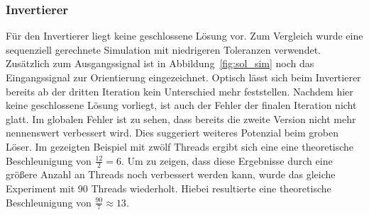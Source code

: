 \subsubsection*{Invertierer}
Für den Invertierer liegt keine geschlossene Lösung vor. Zum Vergleich wurde eine sequenziell gerechnete Simulation mit niedrigeren Toleranzen verwendet. Zusätzlich zum Ausgangssignal ist in Abbildung~\ref{fig:sol_sim} noch das Eingangssignal zur Orientierung eingezeichnet. Optisch lässt sich beim Invertierer bereits ab der dritten Iteration kein Unterschied mehr feststellen. Nachdem hier keine geschlossene Lösung vorliegt, ist auch der Fehler der finalen Iteration nicht glatt. Im globalen Fehler ist zu sehen, dass bereits die zweite Version nicht mehr nennenswert verbessert wird. Dies suggeriert weiteres Potenzial beim groben Löser. Im gezeigten Beispiel mit zwölf Threads ergibt sich eine eine theoretische Beschleunigung von \(\frac{12}{2} = 6\). Um zu zeigen, dass diese Ergebnisse durch eine größere Anzahl an Threads noch verbessert werden kann, wurde das gleiche Experiment mit 90 Threads wiederholt. Hiebei resultierte eine theoretische Beschleunigung von \(\frac{90}{7} \approx 13\).